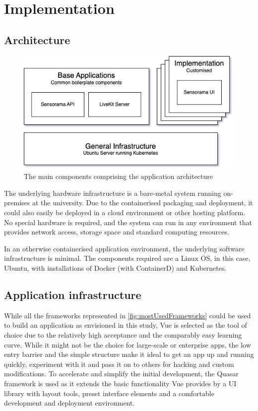\chapter{Implementation}

\section{Architecture}

\begin{figure}[h]
\centering
\includegraphics[scale=0.5]{04_Artefakte/01_Abbildungen/sensorama-stack}
\caption[Sensorama stack diagram]{The main components comprising the application architecture\protect}
\label{fig:sensoramaStack}
\end{figure}

The underlying hardware infrastructure is a bare-metal system running on-premises at the university. Due to the containerised packaging and deployment, it could also easily be deployed in a cloud environment or other hosting platform. No special hardware is required, and the system can run in any environment that provides network access, storage space and standard computing resources.

In an otherwise containerised application environment, the underlying software infrastructure is minimal. The components required are a Linux \ac{OS}, in this case, Ubuntu, with installations of Docker (with ContainerD) and Kubernetes.


\section{Application infrastructure}

While all the frameworks represented in \autoref{fig:mostUsedFrameworks} could be used to build an application as envisioned in this study, Vue is selected as the tool of choice due to the relatively high acceptance and the comparably easy learning curve. While it might not be the choice for large-scale or enterprise apps, the low entry barrier and the simple structure make it ideal to get an app up and running quickly, experiment with it and pass it on to others for hacking and custom modifications. To accelerate and simplify the initial development, the Quasar framework is used as it extends the basic functionality Vue provides by a \ac{UI} library with layout tools, preset interface elements and a comfortable development and deployment environment.

